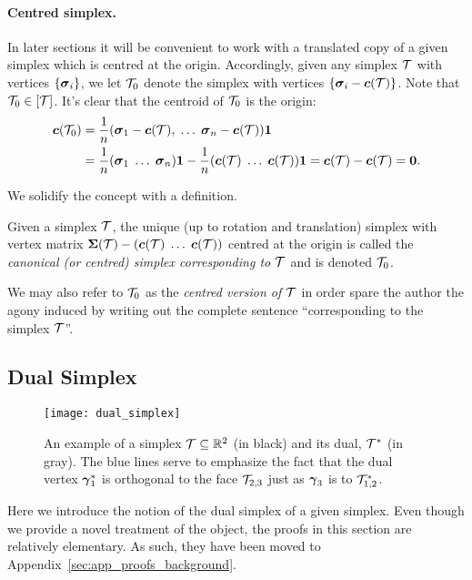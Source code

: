 \paragraph{Centred  simplex.}
In later sections it will be convenient to work with a translated copy of a given simplex which is centred at the origin. Accordingly, given any simplex $\mathcal{T}$ with vertices $\{\vb*{\sigma}_i\}$, we let $\mathcal{T}_0$ denote the simplex with vertices $\{\vb*{\sigma}_i - \vb*{c}(\mathcal{T})\}$. Note that $\mathcal{T}_0\in[\mathcal{T}]$. It's clear that the centroid of $\mathcal{T}_0$ is the origin: 
\begin{align*}
\vb*{c}(\mathcal{T}_0) 
&= \frac{1}{n}(\vb*{\sigma}_1-\vb*{c}(\mathcal{T}),\;\dots\;\vb*{\sigma}_n-\vb*{c}(\mathcal{T}))\vb{1} \\
&= \frac{1}{n}(\vb*{\sigma}_1\;\dots\;\vb*{\sigma}_n)\vb{1} - \frac{1}{n}(\vb*{c}(\mathcal{T})\;\dots\;\vb*{c}(\mathcal{T}))\vb{1} = \vb*{c}(\mathcal{T}) - \vb*{c}(\mathcal{T})=\vb{0}.
\end{align*}

We solidify the concept with a definition. 

\begin{definition}
	\label{def:centred_simplex}
	Given a simplex $\mathcal{T}$, the unique (up to rotation and translation) simplex with vertex matrix $\boldsymbol{\Sigma}(\mathcal{T}) - (\vb*{c}(\mathcal{T})\;\dots\;\vb*{c}(\mathcal{T}))$ centred at the origin is called the \emph{canonical (or centred) simplex corresponding to $\mathcal{T}$} and is denoted $\mathcal{T}_0$. 
\end{definition}

We may also refer to $\mathcal{T}_0$ as the \emph{centred version of $\mathcal{T}$} in order  spare  the author the agony induced by writing out the complete  sentence ``corresponding to the simplex $\mathcal{T}$''. 

 

\subsection{Dual Simplex}
\label{sec:background_dual_simplex}

\begin{figure}
	\centering
	\texttt{[image: dual\_simplex]}
	\caption{An example of a simplex $\mathcal{T}\subseteq\mathbb{R}^2$ (in black) and its dual, $\mathcal{T}^*$  (in gray).  The blue lines serve to emphasize the  fact that the dual vertex $\vb*{\gamma}_1^*$ is orthogonal to the face $\mathcal{T}_{2,3}$ just as $\vb*{\gamma}_3$ is to $\mathcal{T}^*_{1,2}$. }
	\label{fig:dual_simplex}
\end{figure}
Here we introduce the notion of the dual simplex of a given simplex. Even  though we provide a novel treatment  of  the object, the proofs in this section   are  relatively elementary. As such, they have been moved to Appendix~\ref{sec:app_proofs_background}. 

